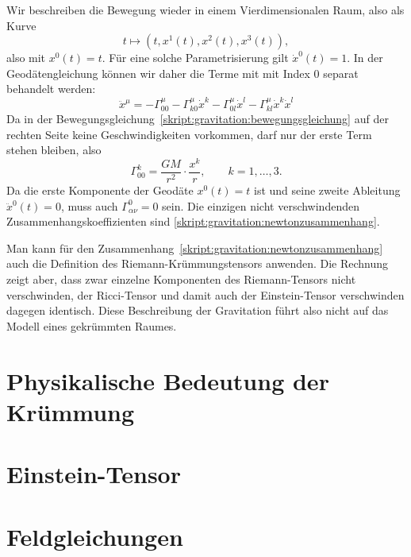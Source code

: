Wir beschreiben die Bewegung wieder in einem Vierdimensionalen Raum,
also als Kurve
\[
t\mapsto (t,x^1(t),x^2(t),x^3(t)),
\]
also mit $x^0(t)=t$.
Für eine solche Parametrisierung gilt $\dot x^0(t)=1$.
In der Geodätengleichung können wir daher die Terme mit mit Index $0$
separat behandelt werden:
\[
\ddot x^\mu
=
-\Gamma^\mu_{00}
-\Gamma^\mu_{k0}\dot x^k -\Gamma^\mu_{0l}\dot x^l
- \Gamma^\mu_{kl}\dot x^k\dot x^l
\]
Da in der Bewegungsgleichung~\eqref{skript:gravitation:bewegungsgleichung}
auf der rechten Seite keine Geschwindigkeiten vorkommen, darf nur der
erste Term stehen bleiben, also
\begin{equation}
\Gamma^k_{00} = \frac{GM}{r^2}\cdot \frac{x^k}{r},\qquad k=1,\dots,3.
\label{skript:gravitation:newtonzusammenhang}
\end{equation}
Da die erste Komponente der Geodäte $x^0(t)=t$ ist und seine zweite
Ableitung $\ddot x^0(t)=0$, muss auch $\Gamma^0_{\alpha\nu}=0$ sein.
Die einzigen nicht verschwindenden Zusammenhangskoeffizienten sind
\eqref{skript:gravitation:newtonzusammenhang}.

Man kann für den Zusammenhang~\eqref{skript:gravitation:newtonzusammenhang}
auch die Definition des Riemann-Krümmungstensors anwenden.
Die Rechnung zeigt aber, dass zwar einzelne Komponenten des Riemann-Tensors
nicht verschwinden, der Ricci-Tensor und damit auch der Einstein-Tensor
verschwinden dagegen identisch.
Diese Beschreibung der Gravitation führt also nicht auf das Modell
eines gekrümmten Raumes.

\section{Physikalische Bedeutung der Krümmung}

\section{Einstein-Tensor}

\section{Feldgleichungen}

